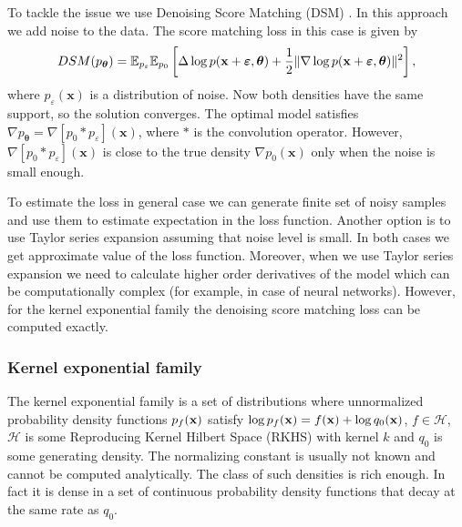 To tackle the issue we use Denoising Score Matching (DSM) \cite{Denoising}.
In this approach we add noise to the data.
The score matching loss in this case is given by
\begin{equation}
    \label{eq:denoising_sm}
    DSM(p_{\bm{\theta}}) = \mathbb{E}_{p_{\varepsilon}}\mathbb{E}_{p_0}\left[\Delta \log p({\bf x} + {\bm \varepsilon}, {\bm \theta}) + \frac{1}{2}\|\nabla \log p({\bf x} + {\bm \varepsilon}, {\bm \theta})\|^2\right],
\end{equation}
where $p_{\varepsilon}(\bm{x})$ is a distribution of noise.
Now both densities have the same support, so the solution converges.
The optimal model satisfies
$\nabla p_{\bm{\theta}} = \nabla \left [p_0 * p_{\varepsilon} \right ] (\bm{x})$,
where $*$ is the convolution operator.
However, $\nabla \left [p_0 * p_{\varepsilon} \right ] (\bm{x})$ is
close to the true density $\nabla p_0(\bm{x})$
only when the noise is small enough.

To estimate the loss in general case we can generate finite set of
noisy samples and use them to estimate expectation in the loss function.
Another option is to use Taylor series expansion assuming that noise level is small.
In both cases we get approximate value of the loss function.
Moreover, when we use Taylor series expansion we need to calculate
higher order derivatives of the model which can be computationally complex
(for example, in case of neural networks).
However, for the kernel exponential family the denoising score matching loss
can be computed exactly.

\subsubsection{Kernel exponential family}
The kernel exponential family is a set of distributions where unnormalized
probability density functions
$p_f(\bf{x})$ satisfy
$\log p_f({\bf x}) = f({\bf x}) + \log q_0({\bf x})$,
$f \in \mathcal{H}$,
$\mathcal{H}$ is some Reproducing Kernel Hilbert Space (RKHS) with kernel $k$ and
$q_0$ is some generating density.
The normalizing constant is usually not known and cannot be computed analytically.
The class of such densities is rich enough.
In fact it is dense in a set of continuous probability density functions
that decay at the same rate as $q_0$.

